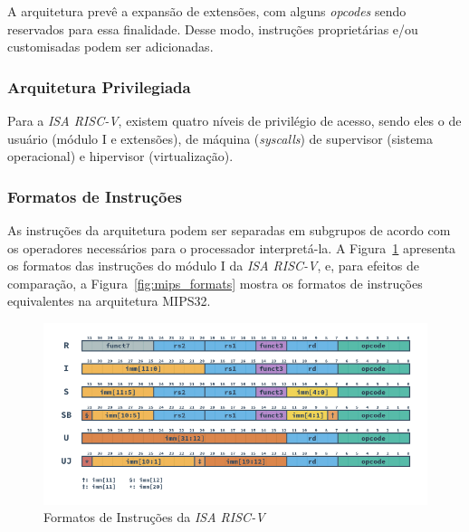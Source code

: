             { A arquitetura prevê a expansão de extensões, com alguns
                \textit{opcodes} sendo reservados para essa finalidade. Desse modo,
                instruções proprietárias e/ou customisadas podem ser adicionadas.
            }

        \subsubsection{Arquitetura Privilegiada}
        { Para a \textit{ISA RISC-V}, existem quatro níveis de privilégio de acesso,
            sendo eles o de usuário (módulo I e extensões), de máquina
            (\textit{syscalls}) de supervisor (sistema operacional) e hipervisor
            (virtualização).
        }

        \subsubsection{Formatos de Instruções}
        { As instruções da arquitetura podem ser separadas em subgrupos de acordo com
            os operadores necessários para o processador interpretá-la. A
            Figura~\ref{fig:riscv_formats} apresenta os formatos das instruções do
            módulo I da \textit{ISA RISC-V}, e, para efeitos de comparação, a
            Figura~\ref{fig:mips_formats} mostra os formatos de instruções equivalentes
            na arquitetura MIPS32.
        }

        \begin{figure}[H]
        \centering
            \includegraphics[width=1\linewidth]{../images/RV_Formats.png}
            \caption{Formatos de Instruções da \textit{ISA RISC-V}
                }\label{fig:riscv_formats}
        \end{figure}

